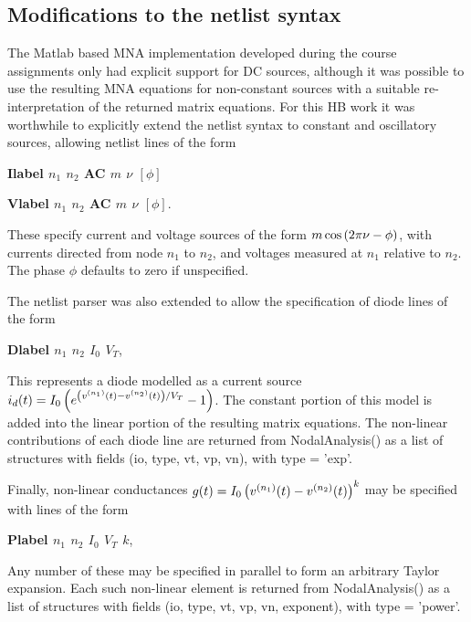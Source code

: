 \subsection{Modifications to the netlist syntax}

The Matlab based MNA implementation developed during the course assignments only had explicit support for DC sources, although it was possible to use the resulting MNA equations for non-constant sources with a suitable re-interpretation of the returned matrix equations.  For this HB work it was worthwhile to explicitly extend the netlist syntax to constant and oscillatory sources, allowing netlist lines of the form  

\begin{center}
\textbf{Ilabel \(n_1\) \(n_2\) AC \(m\) \(\nu\) \([\phi]\)}
\end{center}
\begin{center}
\textbf{Vlabel \(n_1\) \(n_2\) AC \(m\) \(\nu\) \([\phi]\)}.
\end{center}

These specify current and voltage sources of the form \( m \cos\left( 2 \pi \nu - \phi \right) \), with currents directed from node \( n_1 \) to \( n_2 \), and voltages measured at \( n_1 \) relative to \( n_2 \).
The phase \( \phi \) defaults to zero if unspecified.

The netlist parser was also extended to allow the specification of diode lines of the form

\begin{center}
\textbf{Dlabel \(n_1\) \(n_2\) \(I_0\) \(V_T\)},
\end{center}

This represents a diode modelled as a current source \( i_d(t) = I_0 \left( e^{ \left(v^{(n_1)}(t) - v^{(n_2)}(t)\right)/V_T } - 1 \right) \).  The constant portion of this model is added into the linear portion of the resulting matrix equations.  The non-linear contributions of each diode line are returned from NodalAnalysis() as a list of structures with fields (io, type, vt, vp, vn), with type = 'exp'.

Finally, non-linear conductances \( g(t) = I_0 \left(v^{(n_1)}(t) - v^{(n_2)}(t)\right)^k \) may be specified with lines of the form

\begin{center}
\textbf{Plabel \(n_1\) \(n_2\) \(I_0\) \(V_T\) \( k \)},
\end{center}

Any number of these may be specified in parallel to form an arbitrary Taylor expansion.  Each such non-linear element is returned from NodalAnalysis() as a list of structures with fields (io, type, vt, vp, vn, exponent), with type = 'power'.


